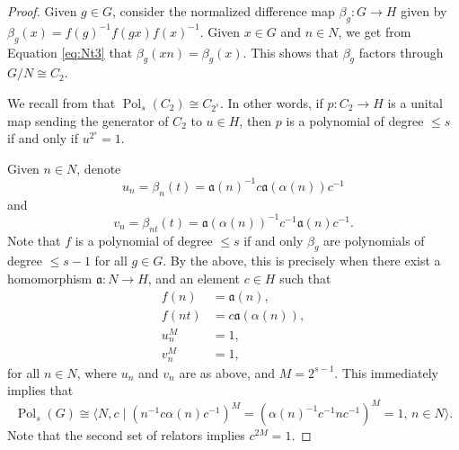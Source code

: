 \documentclass[a4paper,12pt]{amsart}
\theoremstyle{plain}
\theoremstyle{definition}
\theoremstyle{remark}
\numberwithin{equation}{subsection}
\DeclareMathOperator{\Pold}{Pol}
\begin{document}
\begin{proof}
    Given $g\in G$, consider the normalized difference map $\beta_g:G\to H$ given by $\beta_g(x)=f(g)^{-1}f(gx)f(x)^{-1}$. Given $x\in G$ and $n\in N$, we get from Equation \eqref{eq:Nt3} that $\beta_g(xn)=\beta_g(x)$. This shows that $\beta_g$ factors through $G/N\cong C_2$.

    We recall from \cite{JT24,AT26} that $\Pold_s(C_2)\cong C_{2^s}$. In other words, if $p:C_2\to H$ is a unital map sending the generator of $C_2$ to $u\in H$, then $p$ is a polynomial of degree $\le s$ if and only if $u^{2^s}=1$.

    Given $n\in N$, denote
    $$u_n=\beta_n(t)=\mathfrak{a}(n)^{-1}c\mathfrak{a}(\alpha(n))c^{-1}$$
    and
    $$v_n=\beta_{nt}(t)=\mathfrak{a}(\alpha(n))^{-1}c^{-1}\mathfrak{a}(n)c^{-1}.$$
    Note that $f$ is a polynomial of degree $\le s$ if and only $\beta_g$ are polynomials of degree $\le s-1$ for all $g\in G$. By the above, this is precisely when there exist a homomorphism $\mathfrak{a}:N\to H$, and an element $c\in H$ such that
    \begin{align*}
        f(n) &= \mathfrak{a}(n),\\
        f(nt) &= c\mathfrak{a}(\alpha(n)),\\
        u_n^M &= 1,\\
        v_n^M &=1,
    \end{align*}
    for all $n\in N$, where $u_n$ and $v_n$ are as above, and $M=2^{s-1}$. This immediately implies that
    $$\Pold_s(G)\cong \langle N,c\mid (n^{-1}c\alpha(n)c^{-1})^M=(\alpha(n)^{-1}c^{-1}nc^{-1})^M=1,\, n\in N\rangle.$$
    Note that the second set of relators implies $c^{2M}=1$.


\end{proof}
\end{document}
